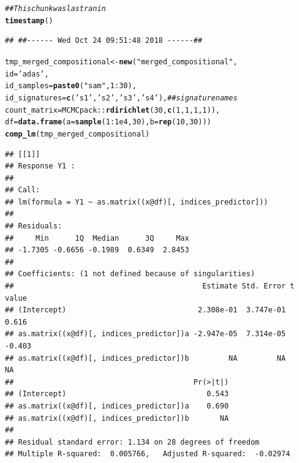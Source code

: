 \documentclass{article}\usepackage[]{graphicx}\usepackage[]{color}
\makeatletter
\newcommand{\hlnum}[1]{\textcolor[rgb]{0.686,0.059,0.569}{#1}}%
\newcommand{\hlstr}[1]{\textcolor[rgb]{0.192,0.494,0.8}{#1}}%
\newcommand{\hlcom}[1]{\textcolor[rgb]{0.678,0.584,0.686}{\textit{#1}}}%
\newcommand{\hlopt}[1]{\textcolor[rgb]{0,0,0}{#1}}%
\newcommand{\hlstd}[1]{\textcolor[rgb]{0.345,0.345,0.345}{#1}}%
\newcommand{\hlkwb}[1]{\textcolor[rgb]{0.69,0.353,0.396}{#1}}%
\newcommand{\hlkwc}[1]{\textcolor[rgb]{0.333,0.667,0.333}{#1}}%
\newcommand{\hlkwd}[1]{\textcolor[rgb]{0.737,0.353,0.396}{\textbf{#1}}}%
\newenvironment{kframe}{%
 \def\at@end@of@kframe{}%
 \ifinner\ifhmode%
  \def\at@end@of@kframe{\end{minipage}}%
  \begin{minipage}{\columnwidth}%
 \fi\fi%
 \def\FrameCommand##1{\hskip\@totalleftmargin \hskip-\fboxsep
 \colorbox{shadecolor}{##1}\hskip-\fboxsep
     \hskip-\linewidth \hskip-\@totalleftmargin \hskip\columnwidth}%
 \MakeFramed {\advance\hsize-\width
   \@totalleftmargin\z@ \linewidth\hsize
   \@setminipage}}%
 {\par\unskip\endMakeFramed%
 \at@end@of@kframe}
\newenvironment{knitrout}{}{} %
\makeatother
\begin{document}
\begin{knitrout}
\color{fgcolor}\begin{kframe}
\begin{alltt}
\hlcom{## This chunk was last ran in}
\hlkwd{timestamp}\hlstd{()}
\end{alltt}
\begin{verbatim}
## ##------ Wed Oct 24 09:51:48 2018 ------##
\end{verbatim}
\begin{alltt}
\hlstd{tmp_merged_compositional} \hlkwb{<-} \hlkwd{new}\hlstd{(}\hlstr{"merged_compositional"}\hlstd{,}
                                \hlkwc{id}\hlstd{=}\hlstr{'adas'}\hlstd{,}
                                \hlkwc{id_samples}\hlstd{=}\hlkwd{paste0}\hlstd{(}\hlstr{"sam"}\hlstd{,} \hlnum{1}\hlopt{:}\hlnum{30}\hlstd{),}
                                \hlkwc{id_signatures}\hlstd{=} \hlkwd{c}\hlstd{(}\hlstr{'s1'}\hlstd{,} \hlstr{'s2'}\hlstd{,} \hlstr{'s3'}\hlstd{,} \hlstr{'s4'}\hlstd{),} \hlcom{## signature names}
                                \hlkwc{count_matrix}\hlstd{=MCMCpack}\hlopt{::}\hlkwd{rdirichlet}\hlstd{(}\hlnum{30}\hlstd{,} \hlkwd{c}\hlstd{(}\hlnum{1}\hlstd{,}\hlnum{1}\hlstd{,}\hlnum{1}\hlstd{,}\hlnum{1}\hlstd{)),}
                                \hlkwc{df}\hlstd{=}\hlkwd{data.frame}\hlstd{(}\hlkwc{a}\hlstd{=}\hlkwd{sample}\hlstd{(}\hlnum{1}\hlopt{:}\hlnum{1e4}\hlstd{,} \hlnum{30}\hlstd{),} \hlkwc{b}\hlstd{=}\hlkwd{rep}\hlstd{(}\hlnum{10}\hlstd{,} \hlnum{30}\hlstd{)))}
\hlkwd{comp_lm}\hlstd{(tmp_merged_compositional)}
\end{alltt}
\begin{verbatim}
## [[1]]
## Response Y1 :
## 
## Call:
## lm(formula = Y1 ~ as.matrix((x@df)[, indices_predictor]))
## 
## Residuals:
##     Min      1Q  Median      3Q     Max 
## -1.7305 -0.6656 -0.1989  0.6349  2.8453 
## 
## Coefficients: (1 not defined because of singularities)
##                                           Estimate Std. Error t value
## (Intercept)                              2.308e-01  3.747e-01   0.616
## as.matrix((x@df)[, indices_predictor])a -2.947e-05  7.314e-05  -0.403
## as.matrix((x@df)[, indices_predictor])b         NA         NA      NA
##                                         Pr(>|t|)
## (Intercept)                                0.543
## as.matrix((x@df)[, indices_predictor])a    0.690
## as.matrix((x@df)[, indices_predictor])b       NA
## 
## Residual standard error: 1.134 on 28 degrees of freedom
## Multiple R-squared:  0.005766,	Adjusted R-squared:  -0.02974 

\end{verbatim}
\end{kframe}
\end{knitrout}
\end{document}
